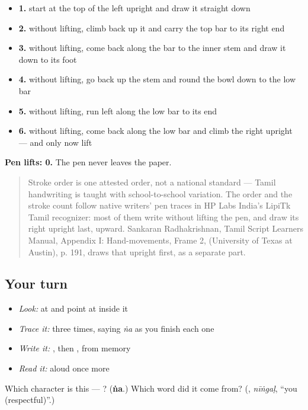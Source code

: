 \begin{itemize}
\raggedright
  \item \textbf{1.} start at the top of the left upright and draw it straight down
  \item \textbf{2.} without lifting, climb back up it and carry the top bar to its right end
  \item \textbf{3.} without lifting, come back along the bar to the inner stem and draw it down to its foot
  \item \textbf{4.} without lifting, go back up the stem and round the bowl down to the low bar
  \item \textbf{5.} without lifting, run left along the low bar to its end
  \item \textbf{6.} without lifting, come back along the low bar and climb the right upright — and only now lift
\end{itemize}

\textbf{Pen lifts: 0.} The pen never leaves the paper.

\begin{quote}
Stroke order is one attested order, not a national standard — Tamil handwriting is taught with school-to-school variation. The order and the stroke count follow native writers' pen traces in HP Labs India's LipiTk Tamil recognizer: most of them write  without lifting the pen, and draw its right upright last, upward. Sankaran Radhakrishnan, Tamil Script Learners Manual, Appendix I: Hand-movements, Frame 2,  (University of Texas at Austin), p. 191, draws that upright first, as a separate part.
\end{quote}

\subsection*{Your turn}
\begin{itemize}
\raggedright
  \item \emph{Look:} at \textbf{} and point at  inside it
  \item \emph{Trace it:}  three times, saying \emph{ṅa} as you finish each one
  \item \emph{Write it:} , then , from memory
  \item \emph{Read it:} \textbf{} aloud once more
\end{itemize}

\begin{tcolorbox}[breakable,colback=teal!4,colframe=teal!35!black,title={Before you move on}]
Which character is this — ? (\textbf{ṅa}.) Which word did it come from? (\textbf{}, \emph{nīṅgaḷ}, \textquotedblleft{}you (respectful)\textquotedblright{}.)
\end{tcolorbox}
